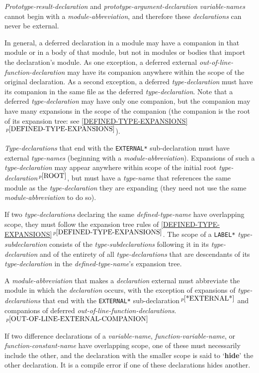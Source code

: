 \documentclass[12pt]{article}
\newcommand{\key}[1]{{\rm \bfseries #1}}
\newcommand{\itemref}[1]{\ref{#1}$\,^{p\pageref{#1}}$}
\newcommand{\pagnote}[1]{$\,^{p\pageref{#1}}$}
\begin{document}
{\em Prototype-result-declaration} and {\em prototype-argument-declaration}
{\em variable-names} cannot begin with a {\em module-abbreviation},
and therefore these {\em declarations} can never be external.

In general, a deferred declaration
in a module may have a companion in that module
or in a body of that module, but not in modules or bodies that import
the declaration's module.
As one exception, a deferred external {\em out-of-line-function-declaration}
may have its companion
anywhere within the scope of the original declaration.
As a second exception, a deferred {\em type-declaration} must have its
companion in the same file as the deferred {\em type-declaration}.
Note that a deferred {\em type-declaration} may have only one
companion, but the companion may have many expansions in the
scope of the companion (the companion is the root of its expansion tree:
see \itemref{DEFINED-TYPE-EXPANSIONS}).

{\em Type-declarations} that end with the {\tt *EXTERNAL*}
sub-declaration must have external {\em type-names}
(beginning with a {\em module-abbreviation}).
Expansions of such a {\em type-declaration} may appear
anywhere within scope of the initial root {\em type-declaration}\pagnote{ROOT},
but must have a {\em type-name} that references the same module
as the {\em type-declaration} they are expanding (they need not use the same
{\em module-abbreviation} to do so).

If two {\em type-declarations} declaring the same {\em defined-type-name}
have overlapping scope, they must follow the expansion tree rules
of \itemref{DEFINED-TYPE-EXPANSIONS}.
The scope of a {\tt *LABEL*} {\em type-subdeclaration}
consists of the {\em type-subdeclarations} following it in its
{\em type-declaration} and of the entirety of all
{\em type-declarations} that are descendants
of its {\em type-declaration} in the {\em defined-type-name}'s
expansion tree.

A {\em module-abbreviation} that makes a {\em declaration} external
must abbreviate the module in which the {\em declaration} occurs,
with the exception of expansions of {\em type-declar\-ations}
that end with the {\tt *EXTERNAL*} sub-declaration\pagnote{*EXTERNAL*}
and companions of deferred
{\em out-of-line-function-declarations}.\pagnote{OUT-OF-LINE-EXTERNAL-COMPANION}

If two difference declarations of a {\em variable-name},
{\em function-variable-name}, or {\em function-con\-stant-name}
have overlapping
scope, one of these must necessarily include the other,
and the declaration with the smaller scope is said to
`\key{hide}'\label{HIDE} the other declaration.
It is a compile error if one of these declarations hides another.
\end{document}
